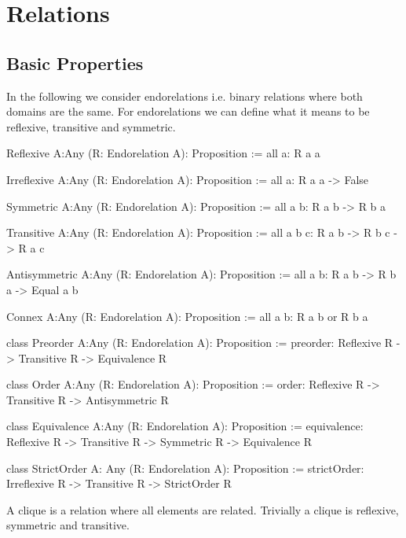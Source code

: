 \newpage


\section{Relations}
\label{sec:certprog-relations}


\subsection{Basic Properties}


In the following we consider endorelations i.e. binary relations where both
domains are the same. For endorelations we can define what it means to be
reflexive, transitive and symmetric.

\begin{alba}
    Reflexive {A:Any} (R: Endorelation A): Proposition :=
        all {a}: R a a

    Irreflexive {A:Any} (R: Endorelation A): Proposition :=
        all {a}: R a a -> False

    Symmetric {A:Any} (R: Endorelation A): Proposition :=
        all {a b}: R a b -> R b a

    Transitive {A:Any} (R: Endorelation A): Proposition :=
        all {a b c}: R a b -> R b c -> R a c

    Antisymmetric {A:Any} (R: Endorelation A): Proposition :=
        all {a b}: R a b -> R b a -> Equal a b

    Connex {A:Any} (R: Endorelation A): Proposition :=
        all {a b}: R a b or R b a

    class
        Preorder {A:Any} (R: Endorelation A): Proposition
    :=
        preorder:
            Reflexive R -> Transitive R -> Equivalence R

    class
        Order {A:Any} (R: Endorelation A): Proposition
    :=
        order:
            Reflexive R -> Transitive R -> Antisymmetric R

    class
        Equivalence {A:Any} (R: Endorelation A): Proposition
    :=
        equivalence:
            Reflexive R -> Transitive R -> Symmetric R -> Equivalence R

    class
        StrictOrder {A: Any} (R: Endorelation A): Proposition
    :=
        strictOrder:
            Irreflexive R -> Transitive R -> StrictOrder R
\end{alba}


A clique is a relation where all elements are related. Trivially a clique is
reflexive, symmetric and transitive.

